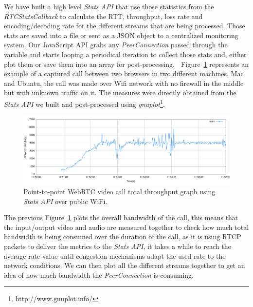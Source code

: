 We have built a high level {\it Stats API} that use those statistics from the {\it RTCStatsCallback} to calculate the RTT, throughput, loss rate and encoding/decoding rate for the different streams that are being processed. Those stats are saved into a file or sent as a JSON object to a centralized monitoring system. Our JavaScript API grabs any {\it PeerConnection} passed through the variable and starts looping a periodical iteration to collect those stats and, either plot them or save them into an array for post-processing. 

Figure~\ref{fig:onetooneWifiRTC} represents an example of a captured call between two browsers in two different machines, Mac and Ubuntu, the call was made over Wifi network with no firewall in the middle but with unknown traffic on it. The measures were directly obtained from the {\it Stats API} we built and post-processed using {\it gnuplot}\footnote{http://www.gnuplot.info/}.

 \begin{figure}[h]
  \centering
    \includegraphics[width=1\textwidth]{./figures/onetooneWifiStatsRTC.pdf}
      \caption[Point-to-point WebRTC video call total throughput graph using {\it Stats API} over public WiFi]{Point-to-point WebRTC video call total throughput graph using {\it Stats API} over public WiFi.}
	\label{fig:onetooneWifiRTC}
\end{figure}

The previous Figure~\ref{fig:onetooneWifiRTC} plots the overall bandwidth of the call, this means that the input/output video and audio are measured together to check how much total bandwidth is being consumed over the duration of the call, as it is using RTCP packets to deliver the metrics to the {\it Stats API}, it takes a while to reach the average rate value until congestion mechanisms adapt the used rate to the network conditions. We can then plot all the different streams together to get an idea of how much bandwidth the {\it PeerConnection} is consuming.

